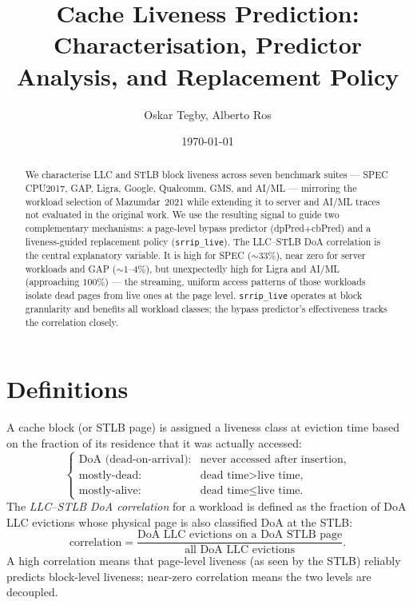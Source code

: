 \documentclass[12pt]{article}
\title{Cache Liveness Prediction:\\[0.4em]
       \large Characterisation, Predictor Analysis, and Replacement Policy}
\author{Oskar Tegby, Alberto Ros}
\date{\today}
\begin{document}
\maketitle

\begin{abstract}
We characterise LLC and STLB block liveness across seven benchmark suites
--- SPEC CPU2017, GAP, Ligra, Google, Qualcomm, GMS, and AI/ML ---
mirroring the workload selection of Mazumdar~2021 while extending it to
server and AI/ML traces not evaluated in the original work.
We use the resulting signal to guide two complementary mechanisms: a
page-level bypass predictor (dpPred$+$cbPred) and a liveness-guided
replacement policy (\texttt{srrip\_live}).
The LLC--STLB DoA correlation is the central explanatory variable.
It is high for SPEC (${\sim}33\%$), near zero for server workloads and
GAP (${\sim}1$--$4\%$), but unexpectedly high for Ligra and AI/ML
(approaching $100\%$) --- the streaming, uniform access patterns of
those workloads isolate dead pages from live ones at the page level.
\texttt{srrip\_live} operates at block granularity and benefits all
workload classes; the bypass predictor's effectiveness tracks the
correlation closely.
\end{abstract}

\tableofcontents

\section{Definitions}
\label{sec:defs}

A cache block (or STLB page) is assigned a liveness class at eviction time
based on the fraction of its residence that it was actually accessed:
\begin{equation}
  \begin{cases}
    \text{DoA (dead-on-arrival):} & \text{never accessed after insertion,} \\
    \text{mostly-dead:}           & \text{dead time} > \text{live time,}   \\
    \text{mostly-alive:}          & \text{dead time} \leq \text{live time.}
  \end{cases}
\end{equation}
The \emph{LLC--STLB DoA correlation} for a workload is defined as the
fraction of DoA LLC evictions whose physical page is also classified DoA
at the STLB:
\begin{equation}
  \text{correlation} =
    \frac{\text{DoA LLC evictions on a DoA STLB page}}
         {\text{all DoA LLC evictions}}.
\end{equation}
A high correlation means that page-level liveness (as seen by the STLB)
reliably predicts block-level liveness; near-zero correlation means the
two levels are decoupled.
\end{document}
